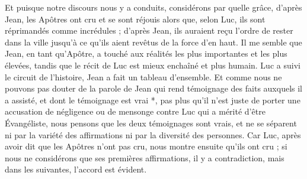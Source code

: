  Et puisque notre discours nous y a conduits, considérons par quelle grâce, d’après Jean, les Apôtres ont cru et se sont réjouis alors que, selon Luc, ils sont réprimandés comme incrédules ; d’après Jean, ils auraient reçu l’ordre de rester dans la ville jusqu'à ce qu'ils aient revêtus de la force d'en haut. Il me semble que Jean, en tant qu’Apôtre, a touché aux réalités les plus importantes et les plus élevées, tandis que le récit de Luc est mieux enchaîné et plus humain. Luc a suivi le circuit de l’histoire, Jean a fait un tableau d’ensemble. Et comme nous ne pouvons pas douter de la parole de Jean qui rend témoignage des faits auxquels il a assisté, et dont le témoignage est vrai *, pas plus qu’il n’est juste de porter une accusation de négligence ou de mensonge contre Luc qui a mérité d’être Évangéliste, nous pensons que les deux témoignages sont vrais, et ne se séparent ni par la variété des affirmations ni par la diversité des personnes. Car Luc, après avoir dit que les Apôtres n’ont pas cru, nous montre ensuite qu’ils ont cru ; si nous ne considérons que ses premières affirmations, il y a contradiction, mais dans les suivantes, l’accord est évident.